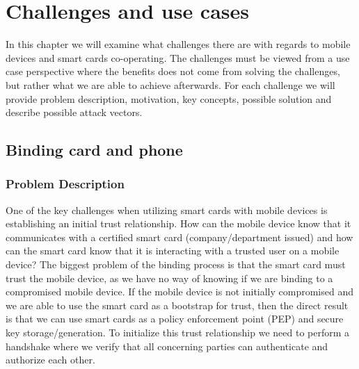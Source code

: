 \chapter{Challenges and use cases}
In this chapter we will examine what challenges there are with regards to mobile devices and smart cards co-operating. The challenges must be viewed from a use case perspective where the benefits does not come from solving the challenges, but rather what we are able to achieve afterwards. For each challenge we will provide problem description, motivation, key concepts, possible solution and describe possible attack vectors.
\section{Binding card and phone}
\label{sec:bindingcardandphone}
\subsection{Problem Description}
One of the key challenges when utilizing smart cards with mobile devices is establishing an initial trust relationship. How can the mobile device know that it communicates with a certified smart card (company/department issued) and how can the smart card know that it is interacting with a trusted user on a mobile device? The biggest problem of the binding process is that the smart card must trust the mobile device, as we have no way of knowing if we are binding to a compromised mobile device.  If the mobile device is not initially compromised and we are able to use the smart card as a bootstrap for trust, then the direct result is that we can use smart cards as a policy enforcement point (PEP) and secure key storage/generation. To initialize this trust relationship we need to perform a handshake where we verify that all concerning parties can authenticate and authorize each other.

